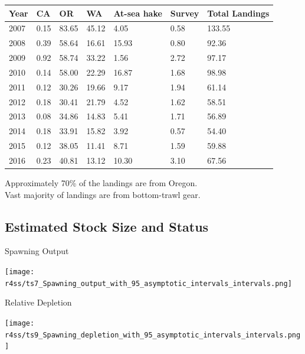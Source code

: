 \documentclass[pdf]{beamer}\usepackage[]{graphicx}\usepackage[]{color}
\begin{document}
\begin{frame}[t]
  \begin{table}[ht]
  \centering
  \begin{tabular}{p{0.4in}p{0.4in}p{0.4in}p{0.4in}p{0.4in}p{0.4in}p{0.6in}}
  Year & CA & OR & WA & At-sea hake & Survey & Total Landings \\ 
  \hline
  2007 & 0.15 & 83.65 & 45.12 & 4.05 & 0.58 & 133.55 \\ 
  2008 & 0.39 & 58.64 & 16.61 & 15.93 & 0.80 & 92.36 \\ 
  2009 & 0.92 & 58.74 & 33.22 & 1.56 & 2.72 & 97.17 \\ 
  2010 & 0.14 & 58.00 & 22.29 & 16.87 & 1.68 & 98.98 \\ 
  2011 & 0.12 & 30.26 & 19.66 & 9.17 & 1.94 & 61.14 \\ 
  2012 & 0.18 & 30.41 & 21.79 & 4.52 & 1.62 & 58.51 \\ 
  2013 & 0.08 & 34.86 & 14.83 & 5.41 & 1.71 & 56.89 \\ 
  2014 & 0.18 & 33.91 & 15.82 & 3.92 & 0.57 & 54.40 \\ 
  2015 & 0.12 & 38.05 & 11.41 & 8.71 & 1.59 & 59.88 \\ 
  2016 & 0.23 & 40.81 & 13.12 & 10.30 & 3.10 & 67.56 \\ 
  \hline
  \end{tabular}
  \end{table}
  Approximately 70\% of the landings are from Oregon.\\
  Vast majority of landings are from bottom-trawl gear.
\end{frame}


\subsection{Estimated Stock Size and Status}
\begin{frame}{Spawning Output}
  \begin{center}
    \texttt{[image: r4ss/ts7\_Spawning\_output\_with\_95\_asymptotic\_intervals\_intervals.png]}
  \end{center}
\end{frame}


\begin{frame}{Relative Depletion}
  \begin{center}
    \texttt{[image: r4ss/ts9\_Spawning\_depletion\_with\_95\_asymptotic\_intervals\_intervals.png]}
  \end{center}
\end{frame}
\end{document}
